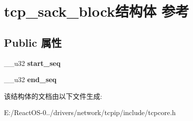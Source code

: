 \hypertarget{structtcp__sack__block}{}\section{tcp\+\_\+sack\+\_\+block结构体 参考}
\label{structtcp__sack__block}
\subsection*{Public 属性}
\begin{DoxyCompactItemize}
\item 
\mbox{\label{structtcp__sack__block_a3a64e31ac3dbcab0b30e60273e774b6a}} 
\+\_\+\+\_\+u32 {\bfseries start\+\_\+seq}
\item 
\mbox{\label{structtcp__sack__block_a099703f88626bf999a14ff504ec60ba3}} 
\+\_\+\+\_\+u32 {\bfseries end\+\_\+seq}
\end{DoxyCompactItemize}


该结构体的文档由以下文件生成\+:\begin{DoxyCompactItemize}
\item 
E\+:/\+React\+O\+S-\/0../drivers/network/tcpip/include/tcpcore.\+h\end{DoxyCompactItemize}
